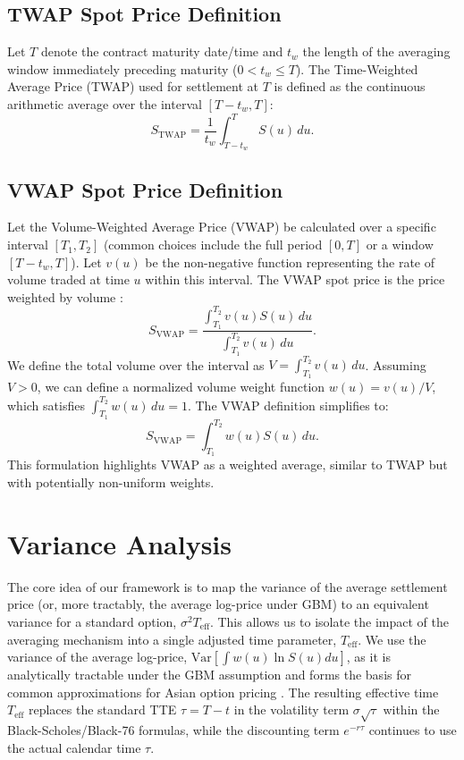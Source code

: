 \documentclass[11pt]{article}
\theoremstyle{plain}
\begin{document}
\subsection{TWAP Spot Price Definition}
Let $T$ denote the contract maturity date/time and $t_w$ the length of the averaging window immediately preceding maturity ($0 < t_w \le T$). The Time-Weighted Average Price (TWAP) used for settlement at $T$ is defined as the continuous arithmetic average over the interval $[T - t_w, T]$:
\begin{equation} \label{eq:twap_def}
  S_{\mathrm{TWAP}} = \frac{1}{t_w} \int_{T - t_w}^{T} S(u) \,du.
\end{equation}

\subsection{VWAP Spot Price Definition}
Let the Volume-Weighted Average Price (VWAP) be calculated over a specific interval $[T_1, T_2]$ (common choices include the full period $[0, T]$ or a window $[T-t_w, T]$). Let $v(u)$ be the non-negative function representing the rate of volume traded at time $u$ within this interval. The VWAP spot price is the price weighted by volume \citep[see e.g.,][]{kissell2013science}:
\begin{equation} \label{eq:vwap_def_general}
  S_{\mathrm{VWAP}} = \frac{\int_{T_1}^{T_2} v(u) S(u)\,du}{\int_{T_1}^{T_2} v(u)\,du}.
\end{equation}
We define the total volume over the interval as $V = \int_{T_1}^{T_2} v(u)\,du$. Assuming $V > 0$, we can define a normalized volume weight function $w(u) = v(u) / V$, which satisfies $\int_{T_1}^{T_2} w(u)\,du = 1$. The VWAP definition simplifies to:
\begin{equation} \label{eq:vwap_def_normalized}
  S_{\mathrm{VWAP}} = \int_{T_1}^{T_2} w(u) S(u)\,du.
\end{equation}
This formulation highlights VWAP as a weighted average, similar to TWAP but with potentially non-uniform weights.

\section{Variance Analysis}
\label{sec:variance}

The core idea of our framework is to map the variance of the average settlement price (or, more tractably, the average log-price under GBM) to an equivalent variance for a standard option, $\sigma^2 T_{\mathrm{eff}}$. This allows us to isolate the impact of the averaging mechanism into a single adjusted time parameter, $T_{\mathrm{eff}}$. We use the variance of the average log-price, $\mathrm{Var}[\int w(u) \ln S(u) du]$, as it is analytically tractable under the GBM assumption and forms the basis for common approximations for Asian option pricing \citep[e.g.,][]{kemna1990pricing}. The resulting effective time $T_{\mathrm{eff}}$ replaces the standard TTE $\tau = T-t$ in the volatility term $\sigma\sqrt{\tau}$ within the Black-Scholes/Black-76 formulas, while the discounting term $e^{-r\tau}$ continues to use the actual calendar time $\tau$.
\end{document}
